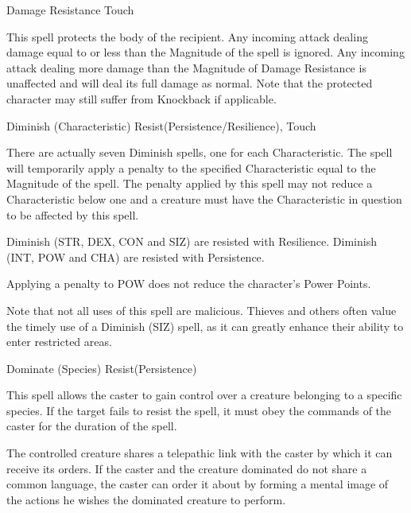 \begin{samepage}
\begin{rpg-spell}
{Damage Resistance}
{Touch}

This spell protects the body of the recipient. Any incoming attack dealing damage equal to or less than the Magnitude of the spell is ignored. Any incoming attack dealing more damage than the Magnitude of Damage Resistance is unaffected and will deal its full damage as normal. Note that the protected character may still suffer from Knockback if applicable. 
\end{rpg-spell}
\end{samepage}


\begin{samepage}
\begin{rpg-spell}
{Diminish (Characteristic)}
{Resist(Persistence/Resilience), Touch}

There are actually seven Diminish spells, one for each Characteristic. The spell will temporarily apply a penalty to the specified Characteristic equal to the Magnitude of the spell. The penalty applied by this spell may not reduce a Characteristic below one and a creature must have the Characteristic in question to be affected by this spell. 

Diminish (STR, DEX, CON and SIZ) are resisted with Resilience. Diminish (INT, POW and CHA) are resisted with Persistence. 

Applying a penalty to POW does not reduce the character’s Power Points.

Note that not all uses of this spell are malicious. Thieves and others often value the timely use of a Diminish (SIZ) spell, as it can greatly enhance their ability to enter restricted areas. 
\end{rpg-spell}
\end{samepage}


\begin{samepage}
\begin{rpg-spell}
{Dominate (Species)}
{Resist(Persistence)}

This spell allows the caster to gain control over a creature belonging to a specific species. If the target fails to resist the spell, it must obey the commands of the caster for the duration of the spell. 

The controlled creature shares a telepathic link with the caster by which it can receive its orders. If the caster and the creature dominated do not share a common language, the caster can order it about by forming a mental image of the actions he wishes the dominated creature to perform.
\end{rpg-spell}
\end{samepage}


